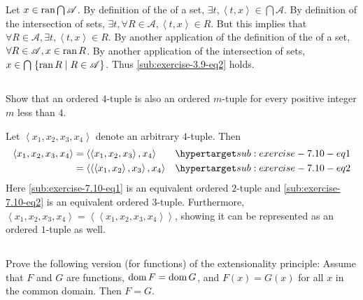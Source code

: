\documentclass{report}
\newcommand{\pair}[1]{\left< #1 \right>}
\begin{document}
\begin{answer}
    Let $x \in \mathop{\text{ran}}{\bigcap{\mathscr{A}}}$.
    By definition of the  of a set,
      $\exists t, \pair{t, x} \in \bigcap{\mathscr{A}}$.
    By definition of the intersection of sets,
      $\exists t, \forall R \in \mathscr{A}, \pair{t, x} \in R$.
    But this implies that
      $\forall R \in \mathscr{A}, \exists t, \pair{t, x} \in R$.
    By another application of the definition of the  of a
      set, $\forall R \in \mathscr{A}, x \in \mathop{\text{ran}}{R}$.
    By another application of the intersection of sets,
      $x \in \bigcap\;\{ \mathop{\text{ran}}{R} \mid R \in \mathscr{A} \}$.
      Thus \eqref{sub:exercise-3.9-eq2} holds.

\end{answer}

\subsection{}%

Show that an ordered $4$-tuple is also an ordered $m$-tuple for every positive
  integer $m$ less than $4$.

\begin{answer}

  Let $\pair{x_1, x_2, x_3, x_4}$ denote an arbitrary $4$-tuple.
  Then
    \begin{align}
      \pair{x_1, x_2, x_3, x_4}
        & = \pair{\pair{x_1, x_2, x_3}, x_4}
          & \hyperlabel{sub:exercise-7.10-eq1} \\
        & = \pair{\pair{\pair{x_1, x_2}, x_3}, x_4}
          & \hyperlabel{sub:exercise-7.10-eq2}
    \end{align}
  Here \eqref{sub:exercise-7.10-eq1} is an equivalent ordered $2$-tuple and
    \eqref{sub:exercise-7.10-eq2} is an equivalent ordered $3$-tuple.
  Furthermore, $\pair{x_1, x_2, x_3, x_4} = \pair{\pair{x_1, x_2, x_3, x_4}}$,
    showing it can be represented as an ordered $1$-tuple as well.

\end{answer}

\subsection{}%

Prove the following version (for functions) of the extensionality principle:
  Assume that $F$ and $G$ are functions, $\mathop{\text{dom}}{F} = \mathop{\text{dom}}{G}$, and
  $F(x) = G(x)$ for all $x$ in the common domain.
Then $F = G$.
\end{document}
